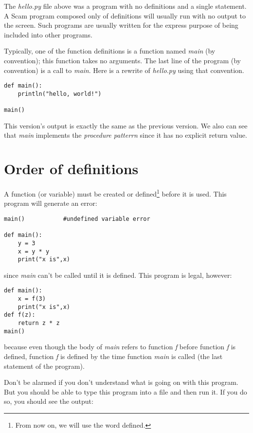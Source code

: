 The {\it hello.py} file above was a program with no
definitions and a single statement. A Scam program composed
only of definitions will usually run with no output to the
screen. Such programs are usually written for the express
purpose of being included
into other programs.

Typically, one of the function definitions is a function
named {\it main} (by convention); this function takes no
arguments.  The last line of the program (by convention)
is a call to {\it main}.
Here is a rewrite of {\it hello.py} using that convention.

\begin{verbatim}
def main():
    println("hello, world!")

main()
\end{verbatim}

This version's output is exactly the same as the previous version.
We also can see that {\it main} implements the {\it procedure patterrn} since
it has no explicit return value.

\section{Order of definitions}

A function (or variable) must be created or defined\footnote{
From now on, we will use the word defined.}
before it is used. This 
program will generate an error:

\begin{verbatim}
main()           #undefined variable error

def main():
    y = 3
    x = y * y
    print("x is",x)

\end{verbatim}

since {\it main} can't be called  until it is defined.
This program is legal, however:

\begin{verbatim}
def main():
    x = f(3)
    print("x is",x)
def f(z):
    return z * z
main()
\end{verbatim}

because even though the body of {\it main} refers to
function {\it f} before function {\it f} is defined,
function {\it f} is defined by the time
function {\it main} is called (the last statement of the program).

Don't be alarmed if you don't understand what is going on with
this program. But you should be able to type this program into
a file and then run it. If you do so, you should see the
output:

